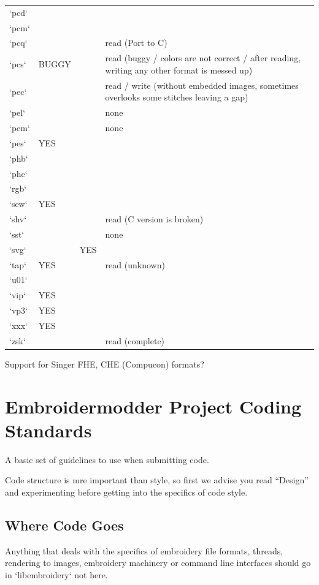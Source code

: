 \documentclass{report}
\begin{document}
\begin{longtable}{l l l p{8cm}}
`pcd` &  &  &  \\
`pcm` &  &  & \\
`pcq` &  &  & read (Port to C) \\
`pcs` & BUGGY &  & read (buggy / colors are not correct / after reading, writing any other format is messed up) \\
`pec` &  &  & read / write (without embedded images, sometimes overlooks some stitches leaving a gap) \\
`pel` &  &  & none \\
`pem` &  &  & none \\
`pes` & YES   &  & \\
`phb` &  &  & \\
`phc` &  &  & \\
`rgb` &  &  & \\
`sew` & YES   &  & \\
`shv` &  &  & read (C version is broken) \\
`sst` &  &  & none \\
`svg` &  & YES   & \\
`tap` & YES   &  & read (unknown) \\
`u01` &  &  & \\
`vip` & YES   &  & \\
`vp3` & YES   &  & \\
`xxx` & YES   &  & \\
`zsk` &  &  & read (complete)
\end{longtable}

Support for Singer FHE, CHE (Compucon) formats?

\section{Embroidermodder Project Coding Standards}

A basic set of guidelines to use when submitting code.

Code structure is mre important than style, so
first we advise you read ``Design'' and experimenting
before getting into the specifics of code style.

\subsection{Where Code Goes}

Anything that deals with the specifics of embroidery file formats, threads, rendering to images, embroidery machinery or command line interfaces should go in `libembroidery` not here.
\end{document}
